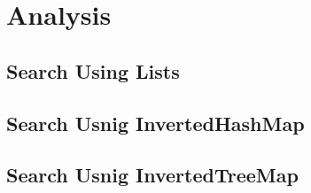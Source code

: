 \section{Analysis} 
\subsection{Search Using Lists}
\subsection{Search Usnig InvertedHashMap}
\subsection{Search Usnig InvertedTreeMap}




